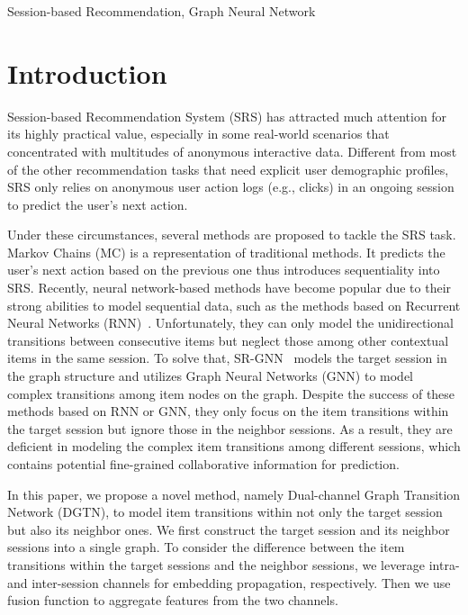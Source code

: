 \documentclass[conference]{IEEEtran}
\begin{document}
\begin{IEEEkeywords}
Session-based Recommendation, Graph Neural Network
\end{IEEEkeywords}

\section{Introduction}
Session-based Recommendation System (SRS) has attracted much attention for its highly practical value, especially in some real-world scenarios that concentrated with multitudes of anonymous interactive data. Different from most of the other recommendation tasks that need explicit user demographic profiles, SRS only relies on anonymous user action logs (e.g., clicks) in an ongoing session to predict the user's next action. 

Under these circumstances, several methods are proposed to tackle the SRS task. Markov Chains (MC) \cite{rendle2010factorizing} is a representation of traditional methods. It predicts the user’s next action based on the previous one thus introduces sequentiality into SRS. 
Recently, neural network-based methods have become popular due to their strong abilities to model sequential data, such as the methods based on Recurrent Neural Networks (RNN)~\cite{hidasi2015session, tan2016improved, li2017neural}.
Unfortunately, they can only model the unidirectional transitions between consecutive items but neglect those among other contextual items in the same session.  
To solve that, SR-GNN~\cite{wu2019srgnn} models the target session in the graph structure and utilizes Graph Neural Networks (GNN) to model complex transitions among item nodes on the graph.
Despite the success of these methods based on RNN or GNN, they only focus on the item transitions within the target session but ignore those in the neighbor sessions.
As a result, they are deficient in modeling the complex item transitions among different sessions, which contains potential fine-grained collaborative information for prediction. 









In this paper, we propose a novel method, namely Dual-channel Graph Transition Network (DGTN), to model item transitions within not only the target session but also its neighbor ones. 
We first construct the target session and its neighbor sessions into a single graph.
To consider the difference between the item transitions within the target sessions and the neighbor sessions, we leverage intra- and inter-session channels for embedding propagation, respectively.
Then we use fusion function to aggregate features from the two channels.
\end{document}
